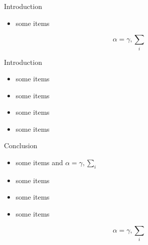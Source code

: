 \documentclass[final]{beamer}
\begin{document}
\begin{frame}{}
\begin{columns}[t]
\begin{column}{.3\linewidth}
\begin{block}{Introduction}
\begin{itemize}
          			\item some items
          		\end{itemize}
          		$$\alpha=\gamma, \sum_{i}$$
        	\end{block}
			\vfill
        	\begin{block}{Introduction}
          		\begin{itemize}
          			\item some items
          			\item some items
          			\item some items
          			\item some items
          		\end{itemize}
        	\end{block}
			\vfill
        	\begin{block}{Conclusion}
          		\begin{itemize}
          			\item some items and $\alpha=\gamma, \sum_{i}$
          			\item some items
          			\item some items
          			\item some items
          		\end{itemize}
          		$$\alpha=\gamma, \sum_{i}$$
        	\end{block}
      \end{column}
    \end{columns}
  \end{frame}
\end{document}
